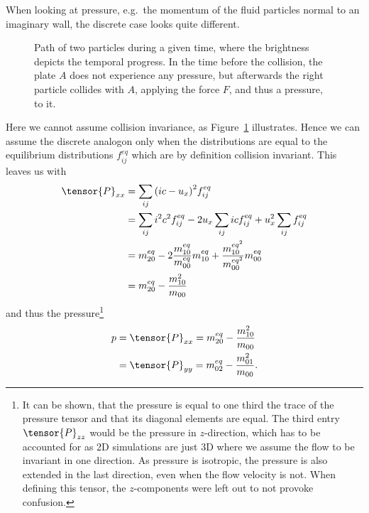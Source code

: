 When looking at pressure, e.g.\ the momentum of the fluid particles normal to an imaginary wall, the discrete case looks quite different.
\begin{figure}
\centering

\caption{Path of two particles during a given time, where the brightness depicts the temporal progress. In the time before the collision, the plate $A$ does not experience any pressure, but afterwards the right particle collides with $A$, applying the force $F$, and thus a pressure, to it.}
\label{fig: billard table}
\end{figure}
Here we cannot assume collision invariance, as Figure~\ref{fig: billard table} illustrates.
Hence we can assume the discrete analogon only when the distributions are equal to the equilibrium distributions $f_{ij}^{eq}$ which are by definition collision invariant.
This leaves us with
\begin{equation}
  \begin{aligned}
    \tensor{P}_{xx}
    & = \sum_{ij} {(ic - u_x)}^2 f_{ij}^{eq}
    \\ & =
    \sum_{ij} i^2 c^2 f_{ij}^{eq} - 2 u_x \sum_{ij} ic f_{ij}^{eq} + u_x^2 \sum_{ij}f_{ij}^{eq}
    \\ & =
    m_{20}^{eq} - 2 \frac{m_{10}^{eq}}{m_{00}^{eq}} m_{10}^{eq} + \frac{m_{10}^{{eq}^2}}{m_{00}^{{eq}^2}} m_{00}^{eq}
    \\ & = m_{20}^{eq} - \frac{m_{10}^2}{m_{00}}
  \end{aligned}
\end{equation}
and thus the pressure\footnote{It can be shown, that the pressure is equal to one third the trace of the pressure tensor and that its diagonal elements are equal. The third entry $\tensor{P}_{zz}$ would be the pressure in $z$-direction, which has to be accounted for as 2D simulations are just 3D where we assume the flow to be invariant in one direction. As pressure is isotropic, the pressure is also extended in the last direction, even when the flow velocity is not. When defining this tensor, the $z$-components were left out to not provoke confusion.}
\begin{equation}
  \label{eq: pressure}
  \begin{aligned}
    p &= \tensor{P}_{xx} = m_{20}^{eq} - \frac{m_{10}^2}{m_{00}}\\
     &= \tensor{P}_{yy} = m_{02}^{eq} - \frac{m_{01}^2}{m_{00}}.
  \end{aligned}
\end{equation}

